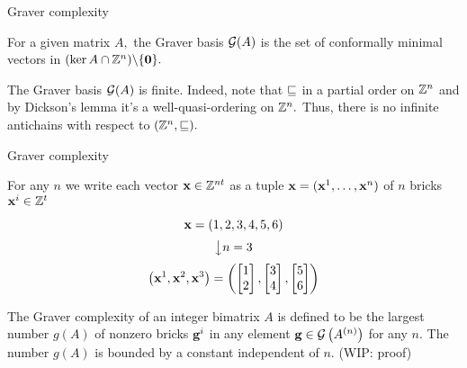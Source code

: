 \documentclass[handout,usenames,dvipsnames]{beamer}
\begin{document}
\begin{frame}{Graver complexity}
    \begin{defi*}
        For a given matrix $A,$ the Graver basis $\mathcal{G}(A)$ is the set of conformally minimal vectors in $(\ker A \cap \mathbb{Z}^n)\backslash \{\textbf{0}\}.$
    \end{defi*}
    \begin{fakt}
        The Graver basis $\mathcal{G}(A)$ is finite. Indeed, note that $\sqsubseteq$ in a partial order on $\mathbb{Z}^n$ and by Dickson's lemma it's a well-quasi-ordering on $\mathbb{Z}^n.$ Thus, there is no infinite antichains with respect to $(\mathbb{Z}^n, \sqsubseteq).$
    \end{fakt}
\end{frame}

\begin{frame}{Graver complexity}
    \begin{minipage}{0.4\textwidth}
        \begin{defi}[Brick]
            For any $n$ we write each vector $\textbf{x} \in \mathbb{Z}^{nt}$ as a tuple $\textbf{x} = (\textbf{x}^1, \ldots, \textbf{x}^n)$ of $n$ bricks $\textbf{x}^i \in \mathbb{Z}^t$
        \end{defi}
    \end{minipage}
    \begin{minipage}{0.55\textwidth}
    \begin{center}
        $$
            \textbf{x} = (1, 2, 3, 4, 5, 6)
        $$
        $$
            \big\downarrow n = 3
        $$
        $$
            \left(\textbf{x}^1, \textbf{x}^2, \textbf{x}^3\right) = \left(
                \left[\begin{matrix}
                    1 \\ 2
                \end{matrix}\right],
                \left[\begin{matrix}
                    3 \\ 4
                \end{matrix}\right],
                \left[\begin{matrix}
                    5 \\ 6
                \end{matrix}\right]
            \right)
        $$
    \end{center}
    \end{minipage}
    \begin{defi}
        The Graver complexity of an integer bimatrix $A$ is defined to be the largest number $g(A)$ of nonzero bricks $\textbf{g}^i$ in any element $\textbf{g} \in \mathcal{G}\left(A^{(n)}\right)$ for any $n.$
        The number $g(A)$ is bounded by a constant independent of $n.$ (WIP: proof)
    \end{defi}
\end{frame}
\end{document}
